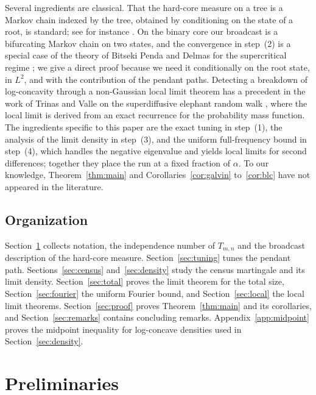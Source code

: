 \documentclass{amsart}
\theoremstyle{definition}
\theoremstyle{remark}
\numberwithin{equation}{section}
\begin{document}
Several ingredients are classical. That the hard-core measure on a tree is a Markov chain indexed by the tree, obtained by conditioning on the state of a root, is standard; see for instance \cite[Section~3]{FLNYZ26}. On the binary core our broadcast is a bifurcating Markov chain on two states, and the convergence in step~(2) is a special case of the theory of Bitseki Penda and Delmas for the supercritical regime \cite[Lemma~3.8, Theorem~3.9 and Corollary~3.11]{BPD21}; we give a direct proof because we need it conditionally on the root state, in $L^2$, and with the contribution of the pendant paths. Detecting a breakdown of log-concavity through a non-Gaussian local limit theorem has a precedent in the work of Trinas and Valle on the superdiffusive elephant random walk \cite[Theorem~3.1, Lemma~4.1 and Propositions~4.2 and~4.3]{TV26}, where the local limit is derived from an exact recurrence for the probability mass function. The ingredients specific to this paper are the exact tuning in step~(1), the analysis of the limit density in step~(3), and the uniform full-frequency bound in step~(4), which handles the negative eigenvalue and yields local limits for second differences; together they place the run at a fixed fraction of $\alpha$. To our knowledge, Theorem~\ref{thm:main} and Corollaries~\ref{cor:galvin} to~\ref{cor:blc} have not appeared in the literature.

\subsection{Organization}

Section~\ref{sec:prelim} collects notation, the independence number of $T_{m,n}$ and the broadcast description of the hard-core measure. Section~\ref{sec:tuning} tunes the pendant path. Sections~\ref{sec:census} and~\ref{sec:density} study the census martingale and its limit density. Section~\ref{sec:total} proves the limit theorem for the total size, Section~\ref{sec:fourier} the uniform Fourier bound, and Section~\ref{sec:local} the local limit theorems. Section~\ref{sec:proof} proves Theorem~\ref{thm:main} and its corollaries, and Section~\ref{sec:remarks} contains concluding remarks. Appendix~\ref{app:midpoint} proves the midpoint inequality for log-concave densities used in Section~\ref{sec:density}.

\section{Preliminaries}\label{sec:prelim}
\end{document}
